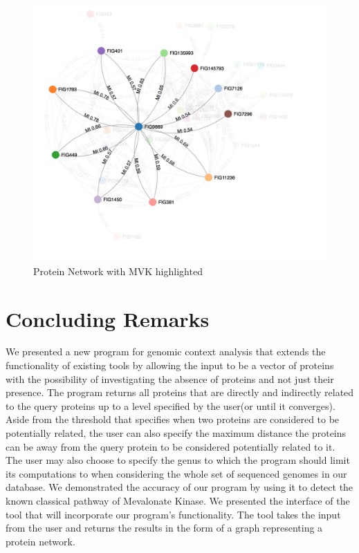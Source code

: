 \documentclass{ucetd}
\begin{document}
\begin{figure}[b!]
\centering
\includegraphics[scale=0.5]{MVKNetwork}
\caption{Protein Network with MVK highlighted}
\label{fig:Protein Network with MVK highlighted}
\end{figure}


\chapter{Concluding Remarks}
We presented a new program for genomic context analysis that extends the functionality of existing tools by allowing the input to be a vector of proteins with the possibility of investigating the absence of proteins and not just their presence. The program returns all proteins that are directly and indirectly related to the query proteins up to a level specified by the user(or until it converges). Aside from the threshold that specifies when two proteins are considered to be potentially related, the user can also specify the maximum distance the proteins can be away from the query protein to be considered potentially related to it. The user may also choose to specify the genus to which the program should limit its computations to when considering the whole set of sequenced genomes in our database. 
We demonstrated the accuracy of our program by using it to detect the known classical pathway of Mevalonate Kinase. We presented the interface of the tool that will incorporate our program's functionality. The tool takes the input from the user and returns the results in the form of a graph representing a protein network.
\end{document}
